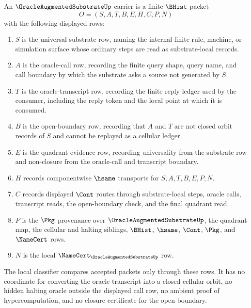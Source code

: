 \begin{definition}
\label{def:oracle-augmented-substrate-carrier}
An $\OracleAugmentedSubstrateUp$ carrier is a finite $\BHist$ packet
$$
O=(S,A,T,B,E,H,C,P,N)
$$
with the following displayed rows:
\begin{enumerate}
\item $S$ is the universal substrate row, naming the internal finite rule, machine, or simulation surface whose ordinary steps are read as substrate-local records.
\item $A$ is the oracle-call row, recording the finite query shape, query name, and call boundary by which the substrate asks a source not generated by $S$.
\item $T$ is the oracle-transcript row, recording the finite reply ledger used by the consumer, including the reply token and the local point at which it is consumed.
\item $B$ is the open-boundary row, recording that $A$ and $T$ are not closed orbit records of $S$ and cannot be replayed as a cellular ledger.
\item $E$ is the quadrant-evidence row, recording universality from the substrate row and non-closure from the oracle-call and transcript boundary.
\item $H$ records componentwise $\hsame$ transports for $S,A,T,B,E,P,N$.
\item $C$ records displayed $\Cont$ routes through substrate-local steps, oracle calls, transcript reads, the open-boundary check, and the final quadrant read.
\item $P$ is the $\Pkg$ provenance over $\OracleAugmentedSubstrateUp$, the quadrant map, the cellular and halting siblings, $\BHist$, $\hsame$, $\Cont$, $\Pkg$, and $\NameCert$ rows.
\item $N$ is the local $\NameCert_{\OracleAugmentedSubstrateUp}$ row.
\end{enumerate}
The local classifier compares accepted packets only through these rows. It has no coordinate for converting the oracle transcript into a closed cellular orbit, no hidden halting oracle outside the displayed call row, no ambient proof of hypercomputation, and no closure certificate for the open boundary.
\end{definition}

